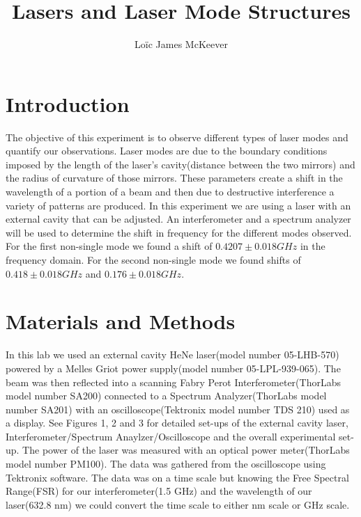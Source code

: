 \documentclass{article}
\begin{document}
\title{Lasers and Laser Mode Structures}
\author{Loïc James McKeever}

\maketitle

\section{Introduction}

The objective of this experiment is to observe different types of laser modes and quantify our observations.  Laser modes are due to the boundary conditions imposed by the length of the laser's cavity(distance between the two mirrors) and the radius of curvature of those mirrors.  These parameters create a shift in the wavelength of a portion of a beam and then due to destructive interference a variety of patterns are produced.  In this experiment we are using a laser with an external cavity that can be adjusted.  An interferometer and a spectrum analyzer will be used to determine the shift in frequency for the different modes observed. For the first non-single mode we found a shift of $0.4207 \pm 0.018 GHz$ in the frequency domain.  For the second non-single mode we found shifts of $0.418 \pm 0.018 GHz$ and $0.176 \pm 0.018 GHz$.


\section{Materials and Methods}

In this lab we used an external cavity HeNe laser(model number 05-LHB-570) powered by a Melles Griot power supply(model number 05-LPL-939-065).  The beam was then reflected into a scanning Fabry Perot Interferometer(ThorLabs model number SA200) connected to a Spectrum Analyzer(ThorLabs model number SA201) with an oscilloscope(Tektronix model number TDS 210) used as a display.  See Figures 1, 2 and 3 for detailed set-ups of the external cavity laser, Interferometer/Spectrum Anaylzer/Oscilloscope and the overall experimental set-up.  The power of the laser was measured with an optical power meter(ThorLabs model number PM100).  The data was gathered from the oscilloscope using Tektronix software.  The data was on a time scale but knowing the Free Spectral Range(FSR) for our interferometer(1.5 GHz) and the wavelength of our laser(632.8 nm) we could convert the time scale to either nm scale or GHz scale. 
\end{document}
